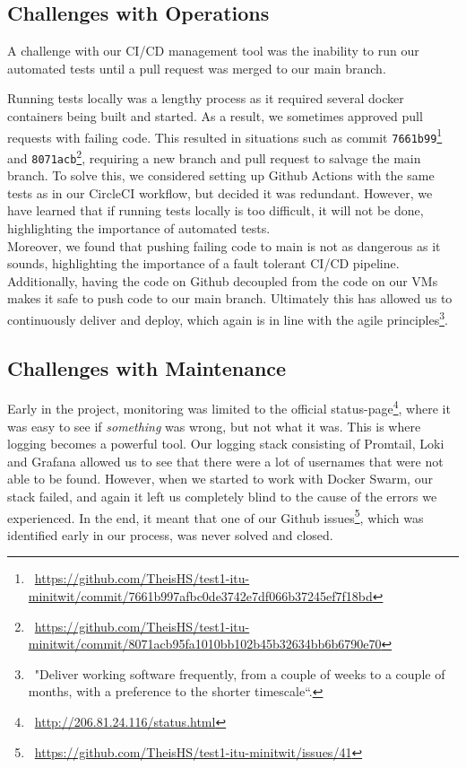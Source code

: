 \subsection{Challenges with Operations}
A challenge with our CI/CD management tool was the inability to run our automated tests until a pull request was merged to our main branch.

Running tests locally was a lengthy process as it required several docker containers being built and started. As a result, we sometimes approved pull requests with failing code. 
This resulted in situations such as commit \texttt{7661b99}\footnote{\ \url{https://github.com/TheisHS/test1-itu-minitwit/commit/7661b997afbc0de3742e7df066b37245ef7f18bd}} and \texttt{8071acb}\footnote{\ \url{https://github.com/TheisHS/test1-itu-minitwit/commit/8071acb95fa1010bb102b45b32634bb6b6790e70}}, requiring a new branch and pull request to salvage the main branch.
To solve this, we considered setting up Github Actions with the same tests as in our CircleCI workflow, but decided it was redundant.
However, we have learned that if running tests locally is too difficult, it will not be done, highlighting the importance of automated tests.\\ 
Moreover, we found that pushing failing code to main is not as dangerous as it sounds, highlighting the importance of a fault tolerant CI/CD pipeline. 
Additionally, having the code on Github decoupled from the code on our VMs makes it safe to push code to our main branch. Ultimately this has allowed us to continuously deliver and deploy, which again is in line with the agile principles\footnote{\ "Deliver working software frequently, from a couple of weeks to a couple of months, with a preference to the shorter timescale``.}.




\subsection{Challenges with Maintenance}
\label{sec:maintenance}

Early in the project, monitoring was limited to the official status-page\footnote{\ \url{http://206.81.24.116/status.html}}, where it was easy to see if \textit{something} was wrong, but not what it was. 
This is where logging becomes a powerful tool.
Our logging stack consisting of Promtail, Loki and Grafana allowed us to see that there were a lot of usernames that were not able to be found. 
However, when we started to work with Docker Swarm, our stack failed, and again it left us completely blind to the cause of the errors we experienced. 
In the end, it meant that one of our Github issues\footnote{\ \url{https://github.com/TheisHS/test1-itu-minitwit/issues/41}}, which was identified early in our process, was never solved and closed.


